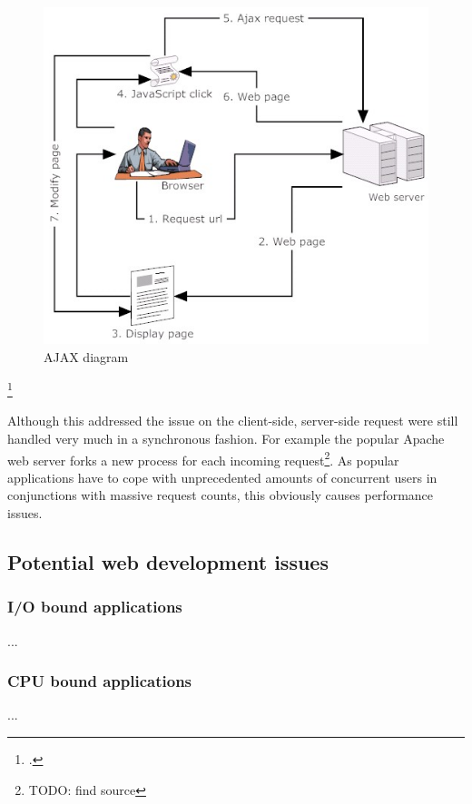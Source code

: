 \begin{figure}[hbtp]
\centering
\includegraphics[scale=0.5]{img/ajax-diagram}
\caption[AJAX Ddiagram]{AJAX diagram\label{img_ajax}}
\end{figure}
\footcitetext{img_ajax}

Although this addressed the issue on the client-side, server-side request were
still handled very much in a synchronous fashion. For example the popular Apache
web server forks a new process for each incoming request\footnote{TODO: find
source}. As popular applications have to cope with unprecedented amounts of
concurrent users in conjunctions with massive request counts, this obviously
causes performance issues.\\



\subsection{Potential web development issues}
\label{potentialissues}

\subsubsection{I/O bound applications}
\label{issue_io}
...
\subsubsection{CPU bound applications}
\label{issue_cpu}
...
